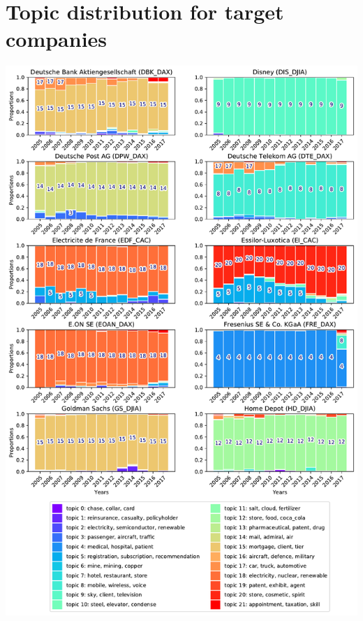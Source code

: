 \documentclass[12pt,journal,letterpaper,oneside,onecolumn]{IEEEtran}
\begin{document}
\section{Topic distribution for target companies}
\begin{center}
\includegraphics[width=0.85\linewidth]{images/companies_on_page_2.pdf}
\end{center}
\end{document}
